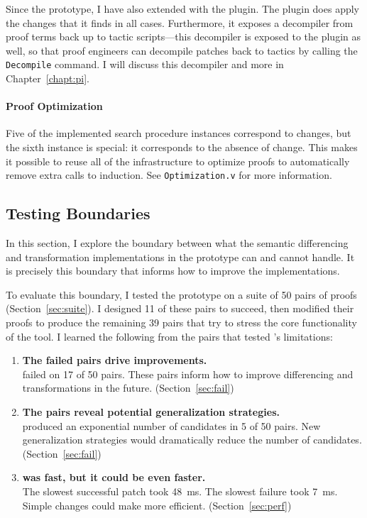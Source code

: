 Since the \sysname prototype, I have also extended \sysnamelong with the \toolnamec plugin.
The \toolnamec plugin does apply the changes that it finds in all cases.
Furthermore, it exposes a decompiler from proof terms back up to tactic scripts---this
decompiler is exposed to the \sysname plugin as well, so that proof engineers can decompile patches
back to tactics by calling the \lstinline{Decompile} command.
I will discuss this decompiler and more in Chapter~\ref{chapt:pi}.

\paragraph{Proof Optimization}
Five of the implemented search procedure instances correspond to changes, but the sixth instance is special:
it corresponds to the absence of change.
This makes it possible to reuse all of the \sysname infrastructure to optimize proofs
to automatically remove extra calls to induction.
See \lstinline{Optimization.v} for more information.

\subsection{Testing Boundaries}
\label{sec:eval}

In this section, I explore the boundary between what the semantic differencing
and transformation implementations in the \sysname prototype can and cannot handle.
It is precisely this boundary that informs how to improve the implementations.

To evaluate this boundary, I tested the \sysname prototype on a suite of 50 pairs of proofs (Section~\ref{sec:suite}).
I designed 11 of these pairs to succeed, then modified their proofs to produce the remaining 39 pairs
that try to stress the core functionality of the tool.
I learned the following from the pairs
that tested \sysname's limitations:

\begin{enumerate}
\item \textbf{The failed pairs drive improvements.} \\
\sysname failed on 17 of 50 pairs. These pairs inform how to improve differencing and transformations in the future. (Section~\ref{sec:fail})
\item \textbf{The pairs reveal potential generalization strategies.} \\
\sysname produced an exponential number of candidates in 5 of 50 pairs.
New generalization strategies would dramatically reduce the number of candidates. (Section~\ref{sec:fail})
\item {} \textbf{was fast, but it could be even faster.} \\
The slowest successful patch took \SI{48}{\ms}. The slowest failure took \SI{7}{\ms}.
Simple changes could make \sysname more efficient. (Section~\ref{sec:perf})
\end{enumerate}


